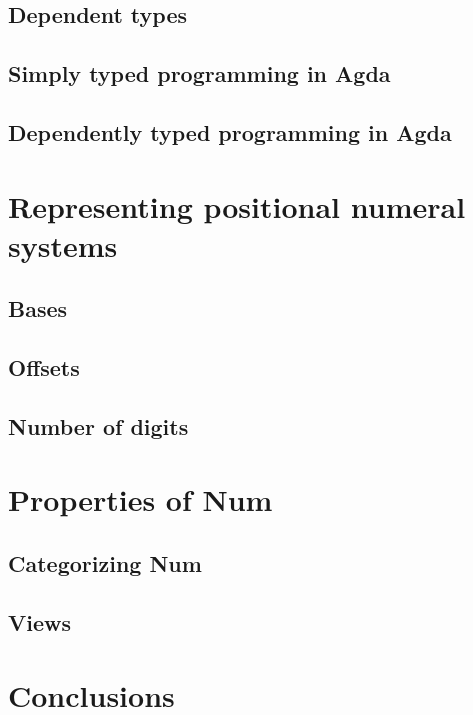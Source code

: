 \documentclass[12pt, a4paper]{article}
\begin{document}
\subsection{Dependent types}

\subsection{Simply typed programming in Agda}

\subsection{Dependently typed programming in Agda}


\section{Representing positional numeral systems}\label{representation}

\subsection{Bases}
\subsection{Offsets}
\subsection{Number of digits}

\section{Properties of Num}
\subsection{Categorizing Num}
\subsection{Views}

\section{Conclusions}\label{conclusions}



\end{document}
